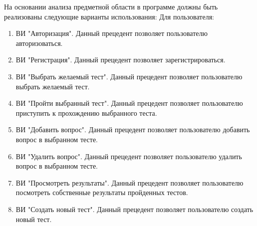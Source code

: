 На основании анализа предметной области в программе должны быть реализованы следующие варианты использования: 
Для пользователя:
\begin{enumerate}
\item ВИ "Авторизация". Данный прецедент позволяет пользователю авторизоваться.
\item ВИ "Регистрация". Данный прецедент позволяет зарегистрироваться.
\item ВИ "Выбрать желаемый тест". Данный прецедент позволяет пользователю выбрать желаемый тест.
\item ВИ "Пройти выбранный тест". Данный прецедент позволяет пользователю приступить к прохождению выбранного теста.
\item ВИ "Добавить вопрос". Данный прецедент позволяет пользователю добавить вопрос в выбранном тесте.
\item ВИ "Удалить вопрос". Данный прецедент позволяет пользователю удалить вопрос в выбранном тесте.
\item ВИ "Просмотреть результаты". Данный прецедент позволяет пользователю посмотреть собственные результаты пройденных тестов.
\item ВИ "Создать новый тест". Данный прецедент позволяет пользователю создать новый тест.
\end{enumerate}

